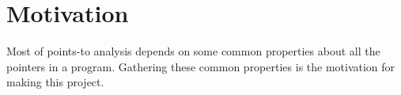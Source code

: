 \section{Motivation}

Most of points-to analysis depends on some common properties about all the pointers in a program. Gathering these common properties is the motivation
for making this project. 
